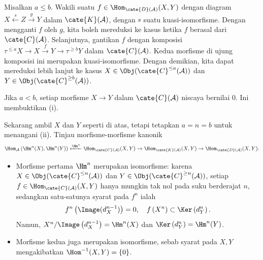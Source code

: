 \begin{bukti}
	Misalkan $a \leq b$. Wakili suatu
	$f \in \Hom_{\cate{D}(\mathcal{A})}(X, Y)$ dengan diagram
	$X \xleftarrow{s} Z \xrightarrow{g} Y$ dalam $\cate{K}(\mathcal{A})$,
	dengan $s$ suatu kuasi-isomorfisme. Dengan mengganti $f$ oleh $g$, kita boleh
	mereduksi ke kasus ketika $f$ berasal dari $\cate{C}(\mathcal{A})$.
	Selanjutnya, gantikan $f$ dengan komposisi
	$\tau^{\leq a} X \to X \xrightarrow{f} Y \to \tau^{\geq b} Y$ dalam
	$\cate{C}(\mathcal{A})$. Kedua morfisme di ujung komposisi ini merupakan
	kuasi-isomorfisme. Dengan
	demikian, kita dapat mereduksi lebih lanjut ke kasus
	$X \in \Obj(\cate{C}^{\leq a}(\mathcal{A}))$ dan
	$Y \in \Obj(\cate{C}^{\geq b}(\mathcal{A}))$.
	
	Jika $a < b$, setiap morfisme $X \to Y$ dalam $\cate{C}(\mathcal{A})$
	niscaya bernilai $0$. Ini membuktikan (i).

	Sekarang ambil $X$ dan $Y$ seperti di atas, tetapi tetapkan $a = n = b$
	untuk menangani (ii). Tinjau morfisme-morfisme kanonik
	\begin{equation}\label{eqn:derived-cat-orthogonality-aux}
		\Hom_{\mathcal{A}}\left( \Hm^n(X), \Hm^n(Y) \right) \xleftarrow{\Hm^n} \Hom_{\cate{C}(\mathcal{A})}(X, Y) \to \Hom_{\cate{K}(\mathcal{A})}(X, Y) \to \Hom_{\cate{D}(\mathcal{A})}(X, Y).
	\end{equation}
	\begin{itemize}
		\item Morfisme pertama $\Hm^n$ merupakan isomorfisme: karena
		$X \in \Obj(\cate{C}^{\leq n}(\mathcal{A}))$ dan
		$Y \in \Obj(\cate{C}^{\geq n}(\mathcal{A}))$, setiap
		$f \in \Hom_{\cate{C}(\mathcal{A})}(X, Y)$ hanya mungkin tak nol pada
		suku berderajat $n$, sedangkan satu-satunya syarat pada $f^n$ ialah
		\[ f^n\left( \Image(d_X^{n-1}) \right) = 0 , \quad f\left(X^n\right) \subset \Ker\left( d_Y^n \right). \]
		Namun,
		$X^n/\Image\left( d_X^{n-1}\right) = \Hm^n(X)$ dan
		$\Ker\left(d_Y^n \right) = \Hm^n(Y)$.
		\item Morfisme kedua juga merupakan isomorfisme, sebab syarat pada $X,Y$
		mengakibatkan $\Hom^{-1}(X, Y) = \{0\}$.
	\end{itemize}


\end{bukti}
